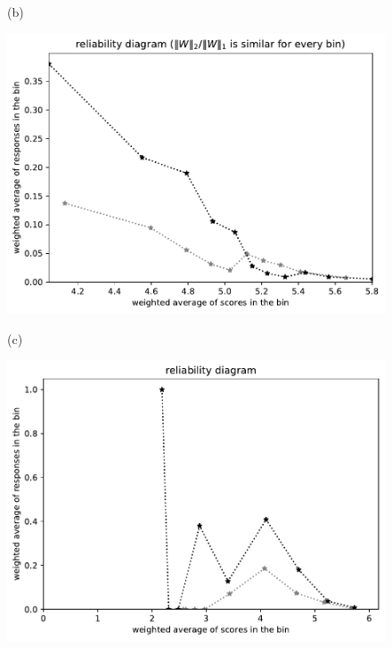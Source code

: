 \documentclass{article}
\newlength{\vertsep}
\newlength{\imsize}
\begin{document}
\begin{figure}
\begin{centering}
(b)
\parbox{\imsize}{\includegraphics[width=\imsize]
{../codes/weighted/County_of_San_Francisco_vs_Contra_Costa-LNGI/equierrs10.pdf}}
\quad\quad
(c)
\parbox{\imsize}{\includegraphics[width=\imsize]
{../codes/weighted/County_of_San_Francisco_vs_Contra_Costa-LNGI/equiscores10.pdf}}

\vspace{\vertsep}


\end{centering}
\end{figure}
\end{document}
